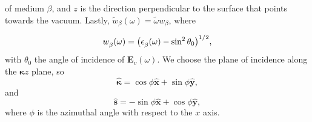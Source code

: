 of medium $\beta$, and $z$ is the direction perpendicular to the surface that
points towards the vacuum. Lastly, $\tilde{w}_{\beta}(\omega)=\tilde{\omega}
w_{\beta}$, where
\begin{equation}\label{r3}
w^{\strut}_{\beta}(\omega) = 
\big(
\epsilon^{\strut}_{\beta}(\omega) - \sin^{2}\theta_{0}
\big)^{1/2},
\end{equation}
with $\theta_{0}$ the angle of incidence of $\mathbf{E}_{v}(\omega)$. We choose
the plane of incidence along the $\boldsymbol{\kappa}z$ plane, so
\begin{equation}\label{eqapp:mc1}
\hat{\boldsymbol{\kappa}}
= \cos\phi\hat{\mathbf{x}} + \sin\phi\hat{\mathbf{y}},
\end{equation}
and
\begin{equation}\label{eqapp:mmc2}
\hat{\mathbf{s}} = -\sin\phi\hat{\mathbf{x}} + \cos\phi\hat{\mathbf{y}},
\end{equation}
where $\phi$ is the azimuthal angle with respect to the $x$ axis.

